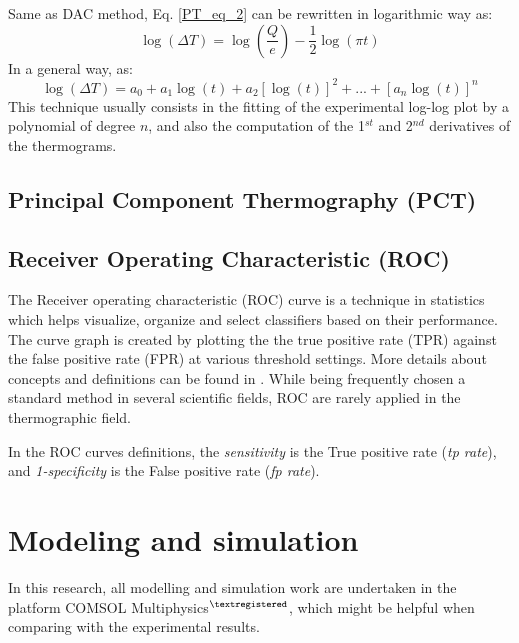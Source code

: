 Same as DAC method, Eq. \ref{PT_eq_2} can be rewritten  in logarithmic way as:
\begin{equation}
\log (\Delta T) = \log (\frac{Q}{e}) - \frac{1}{2}\log (\pi t)
\end{equation}
In a general way, as: %
\begin{equation}
\log (\Delta T) = a_0 + a_1\log (t) + a_2[\log (t)]^2 +...+ [a_n\log(t)]^n
\end{equation}
This technique usually consists in the fitting of the experimental log-log plot by a polynomial of degree $n$, and also the computation of the 1$^{st}$ and 2$^{nd}$ derivatives of the thermograms.



\subsection{Principal Component Thermography (PCT)}

\subsection{Receiver Operating 	Characteristic (ROC)}
The Receiver operating characteristic (ROC) curve is a technique in statistics which helps visualize, organize and select classifiers based on their performance. The curve graph is created by plotting the the true positive rate (TPR) against the false positive rate (FPR) at various threshold settings. More details about concepts and definitions can be found in \citep{Fawcett2006}. While being frequently chosen a standard method in several scientific fields, ROC are rarely applied in the thermographic field.\citep{Bison2014a} 

In the ROC curves definitions, the \textit{sensitivity} is the True positive rate (\textit{tp rate}), and \textit{1-specificity} is the False positive rate (\textit{fp rate}).


\section{Modeling and simulation}
In this research, all modelling and simulation work are undertaken in the platform COMSOL Multiphysics$^{\textregistered}$, which might be helpful when comparing with the experimental results.

